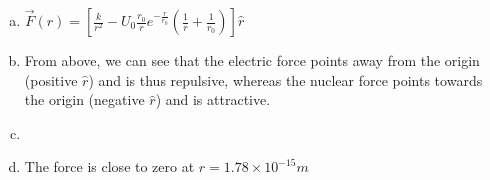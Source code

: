\begin{finalanswer}
\begin{enumerate}[(a)]
\item $\vec F(r)=\left[\frac{k}{r^2}-U_0\frac{r_0}{r}e^{-\frac{r}{r_0}}\left(\frac{1}{r} + \frac{1}{r_0}\right) \right] \hat r$
\item From above, we can see that the electric force points away from the origin (positive $\hat r$) and is thus repulsive, whereas the nuclear force points towards the origin (negative $\hat r$) and is attractive.
\item {}
\item The force is close to zero at $r = 1.78 \times 10^{-15} m$
\end{enumerate}
\end{finalanswer}
